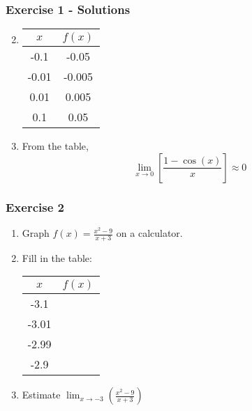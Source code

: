 \documentclass[12pt]{beamer}
\begin{document}
\begin{frame}
	\frametitle{Exercise 1 - Solutions} %
	\begin{multicols}{2}
		\begin{enumerate}
			\setcounter{enumi}{1}
			\large

			\item \begin{table}[]
				      \begin{tabular}{c|c}
					      $x$     & $f(x)$ \\ \hline
					      -0.1  & -0.05  \\
					      -0.01 & -0.005 \\
					      0.01  & 0.005  \\
					      0.1   & 0.05
				      \end{tabular}
			      \end{table}
			\item From the table, \[\displaystyle\lim_{x\to 0}\left[\frac{1-\cos(x)}{x}\right]\approx \boxed{0}\]
		\end{enumerate}
	\end{multicols}
\end{frame}
\begin{frame}
	\frametitle{Exercise 2}
	\initclock
	\large
	\begin{enumerate}
		\item Graph $f(x) = \frac{x^2-9}{x+3}$ on a calculator.
		      \vspace*{\fill}
		      \vspace*{\fill}
		\item Fill in the table:
		      \small
		      \begin{table}[]
			      \begin{tabular}{c|c}
				      $x$     & $f(x)$ \\ \hline
				      -3.1  &        \\
				      -3.01 &        \\
				      -2.99 &        \\
				      -2.9  &
			      \end{tabular}
		      \end{table}
		      \large
		      \vspace*{\fill}
		      \vspace*{\fill}
		\item Estimate $\displaystyle\lim_{x\to -3}\left(\frac{x^2-9}{x+3}\right)$
	\end{enumerate}
	\vspace*{\fill}
	\vspace*{\fill}
	\vspace*{\fill}
	\vspace*{\fill}
	\crono
\end{frame}
\end{document}
